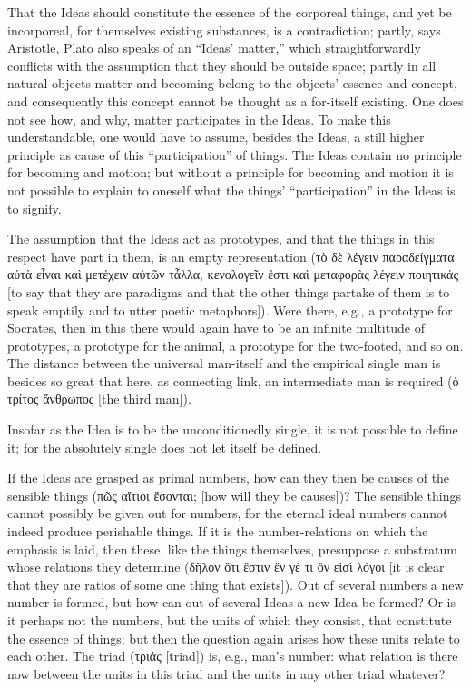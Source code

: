 \documentclass[12pt]{book}
\begin{document}
That the Ideas should constitute the essence of the corporeal things, and yet be incorporeal, for
themselves existing substances, is a contradiction; partly, says Aristotle, Plato also speaks of an
``Ideas' matter,'' which straightforwardly conflicts with the assumption that they should be outside
space; partly in all natural objects matter and becoming belong to the objects' essence and concept, and
consequently this concept cannot be thought as a for-itself existing. One does not see how, and why,
matter participates in the Ideas. To make this understandable, one would have to assume, besides the
Ideas, a still higher principle as cause of this ``participation'' of things. The Ideas contain no
principle for becoming and motion; but without a principle for becoming and
motion it is not possible to explain to oneself what the things' ``participation'' in the Ideas is to
signify.

The assumption that the Ideas act as prototypes, and that the things in this respect have part in them,
is an empty representation (τὸ δὲ λέγειν παραδείγματα αὐτὰ εἶναι καὶ μετέχειν αὐτῶν τἆλλα, κενολογεῖν
ἐστι καὶ μεταφορὰς λέγειν ποιητικάς [to say that they are paradigms and that the other things partake of
them is to speak emptily and to utter poetic metaphors]). Were there, e.g., a prototype for Socrates,
then in this there would again have to be an infinite multitude of prototypes, a prototype for the
animal, a prototype for the two-footed, and so on. The distance between the universal man-itself and the
empirical single man is besides so great that here, as connecting link, an intermediate man is required
(ὁ τρίτος ἄνθρωπος [the third man]).

Insofar as the Idea is to be the unconditionedly single, it is not possible to define it; for the
absolutely single does not let itself be defined.

If the Ideas are grasped as primal numbers, how can they then be causes of the sensible things (πῶς
αἴτιοι ἔσονται; [how will they be causes])? The sensible things cannot possibly be given out for numbers,
for the eternal ideal numbers cannot indeed produce perishable things. If it is the number-relations on
which the emphasis is laid, then these, like the things themselves, presuppose a substratum whose
relations they determine (δῆλον ὅτι ἔστιν ἕν γέ τι ὂν εἰσὶ λόγοι [it is clear that they are ratios of
some one thing that exists]). Out of several numbers a new number is formed, but how can out of several
Ideas a new Idea be formed? Or is it perhaps not the numbers, but the units of which they consist, that
constitute the essence of things; but then the question again arises how these units relate to each
other. The triad (τριάς [triad]) is, e.g., man's number: what relation is there now between the units in
this triad and the units in any other triad whatever?
\end{document}
